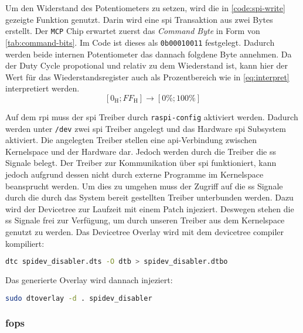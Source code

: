 Um den Widerstand des Potentiometers zu setzen, wird die in \autoref{code:spi-write} gezeigte Funktion genutzt.
Darin wird eine \gls{spi} Transaktion aus zwei Bytes erstellt.
Der \texttt{MCP} Chip erwartet zuerst das \textit{Command Byte} in Form von \autoref{tab:command-bits}.
Im Code ist dieses als \texttt{0b00010011} festgelegt.
Dadurch werden beide internen Potentiometer das dannach folgdene Byte annehmen.
Da der Duty Cycle propotional und relativ zu dem Wiederstand ist, kann hier der Wert für das Wiederstandsregister auch als Prozentbereich wie in \autoref{eq:interpret} interpretiert werden.
\begin{equation}
    \left[0_{\text{H}}; FF_{\text{H}}\right] \rightarrow \left[0\%; 100\%\right]
    \label{eq:interpret}
\end{equation}



Auf dem \gls{rpi} muss der \gls{spi} Treiber durch \texttt{raspi-config} aktiviert werden.
Dadurch werden unter \texttt{/dev} zwei \gls{spi} Treiber angelegt und das Hardware \gls{spi} Subsystem aktiviert.
Die angelegten Treiber stellen eine \gls{api}-Verbindung zwischen Kernelspace und der Hardware dar.
Jedoch werden durch die Treiber die \gls{ss} Signale belegt.
Der Treiber zur Kommunikation über \gls{spi} funktioniert, kann jedoch aufgrund dessen nicht durch externe Programme im Kernelspace beansprucht werden.
Um dies zu umgehen muss der Zugriff auf die \gls{ss} Signale durch die durch das System bereit gestellten Treiber unterbunden werden.
Dazu wird der Devicetree zur Laufzeit mit einem Patch injeziert.
Deswegen stehen die \gls{ss} Signale frei zur Verfügung, um durch unseren Treiber aus dem Kernelspace genutzt zu werden.
Das Devicetree Overlay wird mit dem devicetree compiler kompiliert:
\begin{lstlisting}[language=bash, numbers=none]
dtc spidev_disabler.dts -O dtb > spidev_disabler.dtbo
\end{lstlisting}
\noindent
Das generierte Overlay wird dannach injeziert:
\begin{lstlisting}[language=bash, numbers=none]
sudo dtoverlay -d . spidev_disabler
\end{lstlisting}

\subsubsection{\acrshort{fops}}

